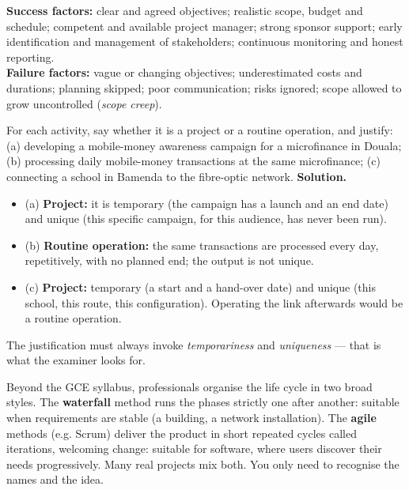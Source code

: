 \documentclass[11pt]{article}
\begin{document}
\begin{aretenir}
\textbf{Success factors:} clear and agreed objectives; realistic scope, budget and schedule; competent and available project manager; strong sponsor support; early identification and management of stakeholders; continuous monitoring and honest reporting.\\
\textbf{Failure factors:} vague or changing objectives; underestimated costs and durations; planning skipped; poor communication; risks ignored; scope allowed to grow uncontrolled (\emph{scope creep}).
\end{aretenir}

\begin{exoresolu}
For each activity, say whether it is a project or a routine operation, and justify: (a) developing a mobile-money awareness campaign for a microfinance in Douala; (b) processing daily mobile-money transactions at the same microfinance; (c) connecting a school in Bamenda to the fibre-optic network.
\tcblower
\textbf{Solution.}
\begin{itemize}
\item (a) \textbf{Project:} it is temporary (the campaign has a launch and an end date) and unique (this specific campaign, for this audience, has never been run).
\item (b) \textbf{Routine operation:} the same transactions are processed every day, repetitively, with no planned end; the output is not unique.
\item (c) \textbf{Project:} temporary (a start and a hand-over date) and unique (this school, this route, this configuration). Operating the link afterwards would be a routine operation.
\end{itemize}
The justification must always invoke \emph{temporariness} and \emph{uniqueness} --- that is what the examiner looks for.
\end{exoresolu}

\begin{savaistu}
Beyond the GCE syllabus, professionals organise the life cycle in two broad styles. The \textbf{waterfall} method runs the phases strictly one after another: suitable when requirements are stable (a building, a network installation). The \textbf{agile} methods (e.g. Scrum) deliver the product in short repeated cycles called iterations, welcoming change: suitable for software, where users discover their needs progressively. Many real projects mix both. You only need to recognise the names and the idea.
\end{savaistu}
\end{document}
